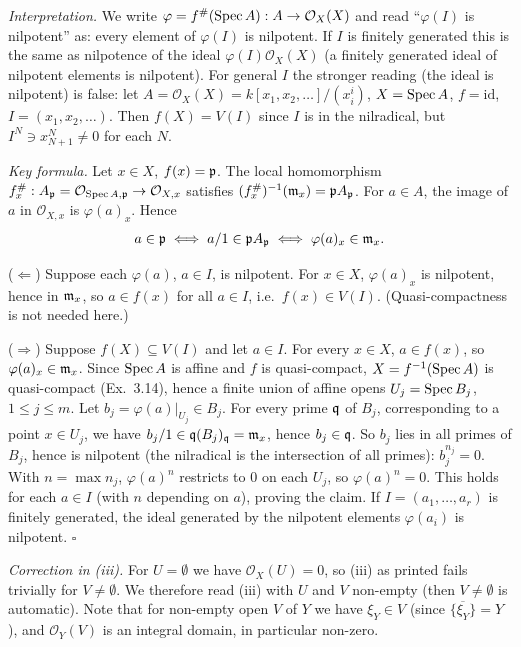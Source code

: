 \documentclass[11pt]{article}
\begin{document}
\pf
\emph{Interpretation.} We write $\varphi=f^\#(\operatorname{Spec} A):A\to\mathcal O_X(X)$ and read ``$\varphi(I)$ is nilpotent'' as: every element of $\varphi(I)$ is nilpotent. If $I$ is finitely generated this is the same as nilpotence of the ideal $\varphi(I)\mathcal O_X(X)$ (a finitely generated ideal of nilpotent elements is nilpotent). For general $I$ the stronger reading (the ideal is nilpotent) is false: let $A=\mathcal O_X(X)=k[x_1,x_2,\dots]/(x_i^i)$, $X=\operatorname{Spec} A$, $f=\mathrm{id}$, $I=(x_1,x_2,\dots)$. Then $f(X)=V(I)$ since $I$ is in the nilradical, but $I^N\ni x_{N+1}^N\ne0$ for each $N$.

\emph{Key formula.} Let $x\in X$, $f(x)=\mathfrak p$. The local homomorphism $f^\#_x:A_\mathfrak p=\mathcal O_{\operatorname{Spec} A,\mathfrak p}\to\mathcal O_{X,x}$ satisfies $(f^\#_x)^{-1}(\mathfrak m_x)=\mathfrak p A_\mathfrak p$. For $a\in A$, the image of $a$ in $\mathcal O_{X,x}$ is $\varphi(a)_x$. Hence
\[ a\in\mathfrak p\iff a/1\in\mathfrak p A_\mathfrak p\iff \varphi(a)_x\in\mathfrak m_x. \]

($\Leftarrow$) Suppose each $\varphi(a)$, $a\in I$, is nilpotent. For $x\in X$, $\varphi(a)_x$ is nilpotent, hence in $\mathfrak m_x$, so $a\in f(x)$ for all $a\in I$, i.e.\ $f(x)\in V(I)$. (Quasi-compactness is not needed here.)

($\Rightarrow$) Suppose $f(X)\subseteq V(I)$ and let $a\in I$. For every $x\in X$, $a\in f(x)$, so $\varphi(a)_x\in\mathfrak m_x$. Since $\operatorname{Spec} A$ is affine and $f$ is quasi-compact, $X=f^{-1}(\operatorname{Spec} A)$ is quasi-compact (Ex.~3.14), hence a finite union of affine opens $U_j=\operatorname{Spec} B_j$, $1\le j\le m$. Let $b_j=\varphi(a)|_{U_j}\in B_j$. For every prime $\mathfrak q$ of $B_j$, corresponding to a point $x\in U_j$, we have $b_j/1\in\mathfrak q(B_j)_\mathfrak q=\mathfrak m_x$, hence $b_j\in\mathfrak q$. So $b_j$ lies in all primes of $B_j$, hence is nilpotent (the nilradical is the intersection of all primes): $b_j^{n_j}=0$. With $n=\max n_j$, $\varphi(a)^n$ restricts to $0$ on each $U_j$, so $\varphi(a)^n=0$. This holds for each $a\in I$ (with $n$ depending on $a$), proving the claim. If $I=(a_1,\dots,a_r)$ is finitely generated, the ideal generated by the nilpotent elements $\varphi(a_i)$ is nilpotent. \hfill$\square$

\pf
\emph{Correction in (iii).} For $U=\emptyset$ we have $\mathcal O_X(U)=0$, so (iii) as printed fails trivially for $V\ne\emptyset$. We therefore read (iii) with $U$ and $V$ non-empty (then $V\neq\emptyset$ is automatic). Note that for non-empty open $V$ of $Y$ we have $\xi_Y\in V$ (since $\overline{\{\xi_Y\}}=Y$), and $\mathcal O_Y(V)$ is an integral domain, in particular non-zero.
\end{document}
